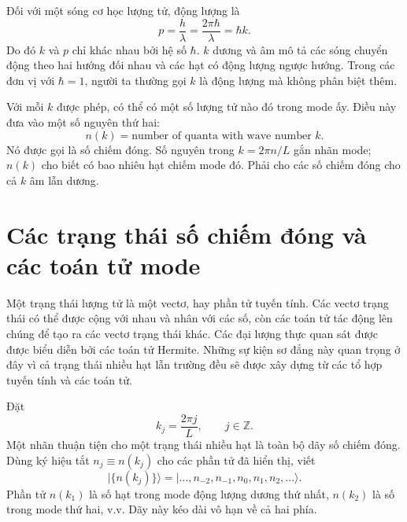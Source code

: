 Đối với một sóng cơ học lượng tử, động lượng là
\begin{equation}
p=\frac{h}{\lambda}
=\frac{2\pi\hbar}{\lambda}
=\hbar k.
\end{equation}
Do đó \(k\) và \(p\) chỉ khác nhau bởi hệ số \(\hbar\). \(k\) dương và âm mô tả các sóng chuyển động theo hai hướng đối nhau và các hạt có động lượng ngược hướng. Trong các đơn vị với \(\hbar=1\), người ta thường gọi \(k\) là động lượng mà không phân biệt thêm.

Với mỗi \(k\) được phép, có thể có một số lượng tử nào đó trong mode ấy. Điều này đưa vào một số nguyên thứ hai:
\begin{equation}
n(k)=\text{number of quanta with wave number }k.
\end{equation}
Nó được gọi là số chiếm đóng. Số nguyên trong \(k=2\pi n/L\) gắn nhãn mode; \(n(k)\) cho biết có bao nhiêu hạt chiếm mode đó. Phải cho các số chiếm đóng cho cả \(k\) âm lẫn dương.

\begin{classroomqa}
\end{classroomqa}

\section{Các trạng thái số chiếm đóng và các toán tử mode}

Một trạng thái lượng tử là một vectơ, hay phần tử tuyến tính. Các vectơ trạng thái có thể được cộng với nhau và nhân với các số, còn các toán tử tác động lên chúng để tạo ra các vectơ trạng thái khác. Các đại lượng thực quan sát được được biểu diễn bởi các toán tử Hermite. Những sự kiện sơ đẳng này quan trọng ở đây vì cả trạng thái nhiều hạt lẫn trường đều sẽ được xây dựng từ các tổ hợp tuyến tính và các toán tử.

Đặt
\begin{equation}
k_j=\frac{2\pi j}{L},
\qquad j\in\mathbb Z.
\end{equation}
Một nhãn thuận tiện cho một trạng thái nhiều hạt là toàn bộ dãy số chiếm đóng. Dùng ký hiệu tắt \(n_j\equiv n(k_j)\) cho các phần tử đã hiển thị, viết
\begin{equation}
\big|\{n(k_j)\}\big\rangle
=
\big|\ldots,n_{-2},n_{-1},n_0,n_1,n_2,\ldots\big\rangle.
\end{equation}
Phần tử \(n(k_1)\) là số hạt trong mode động lượng dương thứ nhất, \(n(k_2)\) là số trong mode thứ hai, v.v. Dãy này kéo dài vô hạn về cả hai phía.

